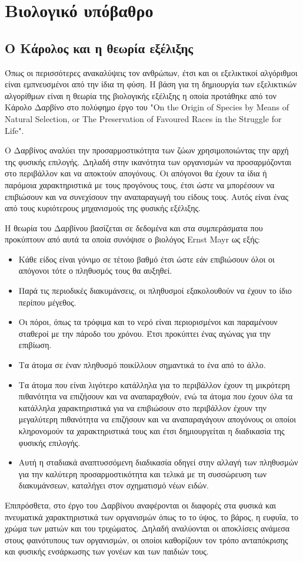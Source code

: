 \section{Βιολογικό υπόβαθρο}

\subsection{Ο Κάρολος και η θεωρία εξέλιξης}
Όπως οι περισσότερες ανακαλύψεις τον ανθρώπων, έτσι και οι εξελικτικοί αλγόριθμοι είναι εμπνευσμένοι από την ίδια τη φύση. Η βάση για τη δημιουργία των εξελικτικών αλγορίθμων είναι η θεωρία της βιολογικής εξέλιξης η οποία προτάθηκε από τον Κάρολο Δαρβίνο στο πολύφημο έργο του "On the Origin of Species by Means of Natural Selection, or The Preservation of Favoured Races in the Struggle for Life".

Ο Δαρβίνος αναλύει την προσαρμοστικότητα των ζώων χρησιμοποιώντας την αρχή της φυσικής επιλογής. Δηλαδή στην ικανότητα των οργανισμών να προσαρμόζονται στο περιβάλλον και να αποκτούν απογόνους. Οι απόγονοι θα έχουν τα ίδια ή παρόμοια χαρακτηριστικά με τους προγόνους τους, έτσι ώστε να μπορέσουν να επιβιώσουν και να συνεχίσουν την αναπαραγωγή του είδους τους. Αυτός είναι ένας από τους κυριότερους μηχανισμούς της φυσικής εξέλιξης.

Η θεωρία του Δαρβίνου βασίζεται σε δεδομένα και στα συμπεράσματα που προκύπτουν από αυτά τα οποία συνόψισε ο βιολόγος Ernst Mayr \cite{Mayr1982} ως εξής:
\begin{itemize}
    \item Κάθε είδος είναι γόνιμο σε τέτοιο βαθμό έτσι ώστε εάν επιβιώσουν όλοι οι απόγονοι τότε ο πληθυσμός τους θα αυξηθεί.
    \item Παρά τις περιοδικές διακυμάνσεις, οι πληθυσμοί εξακολουθούν να έχουν το ίδιο περίπου μέγεθος.
    \item Οι πόροι, όπως τα τρόφιμα και το νερό είναι περιορισμένοι και παραμένουν σταθεροί με την πάροδο του χρόνου. Έτσι προκύπτει ένας αγώνας για την επιβίωση.
    \item Τα άτομα σε έναν πληθυσμό ποικίλλουν σημαντικά το ένα από το άλλο.
    \item Τα άτομα που είναι λιγότερο κατάλληλα για το περιβάλλον έχουν τη μικρότερη πιθανότητα να επιζήσουν και να αναπαραχθούν, ενώ τα άτομα που έχουν όλα τα κατάλληλα χαρακτηριστικά για να επιβιώσουν στο περιβάλλον έχουν την μεγαλύτερη πιθανότητα να επιζήσουν και να αναπαραγάγουν απογόνους οι οποίοι κληρονομούν τα χαρακτηριστικά τους και έτσι δημιουργείται η διαδικασία της φυσικής επιλογής.
    \item Αυτή η σταδιακά αναπτυσσόμενη διαδικασία οδηγεί στην αλλαγή των πληθυσμών για την καλύτερη προσαρμοστικότητα και τελικά με τη συσσώρευση των διακυμάνσεων, καταλήγει στον σχηματισμό νέων ειδών.
\end{itemize}
Επιπρόσθετα, στο έργο του Δαρβίνου αναφέρονται οι διαφορές στα φυσικά και πνευματικά χαρακτηριστικά των οργανισμών \cite{Adamidis} όπως το το ύψος, το βάρος, η ευφυΐα, το χρώμα των ματιών και του τριχώματος. Δηλαδή αναλύονται οι αποκλίσεις ανάμεσα στους φαινότυπους των οργανισμών, οι οποίοι καθορίζουν τον τρόπο ανταπόκρισης και φυσικής ενσάρκωσης των γονέων και των παιδιών τους.

